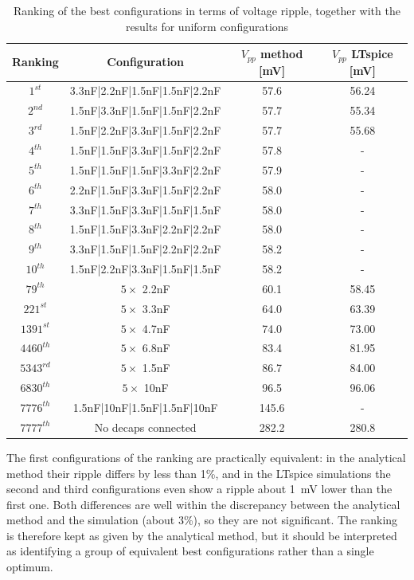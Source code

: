\begin{table}[!h]
\centering
\caption{Ranking of the best configurations in terms of voltage ripple, together with the results for uniform configurations}
\label{tab:ranking}
\begin{tabular}{cccc}
\hline
\textbf{Ranking} & \textbf{Configuration} & $V_{pp}$ method [mV] & $V_{pp}$ LTspice [mV] \\
\hline
\rowcolor[HTML]{EFBF04}
$1^{st}$             & 3.3nF|2.2nF|1.5nF|1.5nF|2.2nF & 57.6 & 56.24 \\
\rowcolor[HTML]{D6D6D6}
$2^{nd}$             & 1.5nF|3.3nF|1.5nF|1.5nF|2.2nF & 57.7 & 55.34 \\
\rowcolor[HTML]{CE8946}
$3^{rd}$             & 1.5nF|2.2nF|3.3nF|1.5nF|2.2nF & 57.7 & 55.68 \\
\rowcolor[HTML]{FFFFFF}
$4^{th}$             & 1.5nF|1.5nF|3.3nF|1.5nF|2.2nF & 57.8 & - \\
$5^{th}$             & 1.5nF|1.5nF|1.5nF|3.3nF|2.2nF & 57.9 & - \\
$6^{th}$             & 2.2nF|1.5nF|3.3nF|1.5nF|2.2nF & 58.0 & - \\
$7^{th}$             & 3.3nF|1.5nF|3.3nF|1.5nF|1.5nF & 58.0 & - \\
$8^{th}$             & 1.5nF|1.5nF|3.3nF|2.2nF|2.2nF & 58.0 & - \\
$9^{th}$             & 3.3nF|1.5nF|1.5nF|2.2nF|2.2nF & 58.2 & - \\
$10^{th}$            & 1.5nF|2.2nF|3.3nF|1.5nF|1.5nF & 58.2 & - \\
$79^{th}$            & $5\times$ 2.2nF & 60.1 & 58.45 \\
$221^{st}$           & $5\times$ 3.3nF & 64.0 & 63.39 \\
$1391^{st}$          & $5\times$ 4.7nF & 74.0 & 73.00 \\
$4460^{th}$          & $5\times$ 6.8nF & 83.4 & 81.95 \\
$5343^{rd}$          & $5\times$ 1.5nF & 86.7 & 84.00 \\
$6830^{th}$          & $5\times$ 10nF & 96.5 & 96.06 \\
$7776^{th}$          & 1.5nF|10nF|1.5nF|1.5nF|10nF & 145.6 & - \\
$7777^{th}$          & No decaps connected & 282.2 & 280.8 \\
\hline
\end{tabular}
\end{table}

\noindent The first configurations of the ranking are practically
equivalent: in the analytical method their ripple differs by less than
1\%, and in the LTspice simulations the second and third configurations
even show a ripple about 1~mV lower than the first one. Both differences
are well within the discrepancy between the analytical method and the
simulation (about 3\%), so they are not significant. The ranking is
therefore kept as given by the analytical method, but it should be
interpreted as identifying a group of equivalent best configurations
rather than a single optimum.


